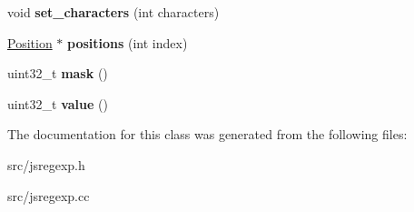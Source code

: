 \begin{DoxyCompactItemize}
\item 
\hypertarget{classv8_1_1internal_1_1_quick_check_details_ab9efae22271416e09adc1849f4332592}{}void {\bfseries set\+\_\+characters} (int characters)\label{classv8_1_1internal_1_1_quick_check_details_ab9efae22271416e09adc1849f4332592}

\item 
\hypertarget{classv8_1_1internal_1_1_quick_check_details_a3c79e51f163a2d00caee94a651b3056b}{}\hyperlink{structv8_1_1internal_1_1_quick_check_details_1_1_position}{Position} $\ast$ {\bfseries positions} (int index)\label{classv8_1_1internal_1_1_quick_check_details_a3c79e51f163a2d00caee94a651b3056b}

\item 
\hypertarget{classv8_1_1internal_1_1_quick_check_details_aee05926b1648f61e6743dab204b35270}{}uint32\+\_\+t {\bfseries mask} ()\label{classv8_1_1internal_1_1_quick_check_details_aee05926b1648f61e6743dab204b35270}

\item 
\hypertarget{classv8_1_1internal_1_1_quick_check_details_a76dc597450cb0efa662d7a145e41dd4e}{}uint32\+\_\+t {\bfseries value} ()\label{classv8_1_1internal_1_1_quick_check_details_a76dc597450cb0efa662d7a145e41dd4e}

\end{DoxyCompactItemize}


The documentation for this class was generated from the following files\+:\begin{DoxyCompactItemize}
\item 
src/jsregexp.\+h\item 
src/jsregexp.\+cc\end{DoxyCompactItemize}
